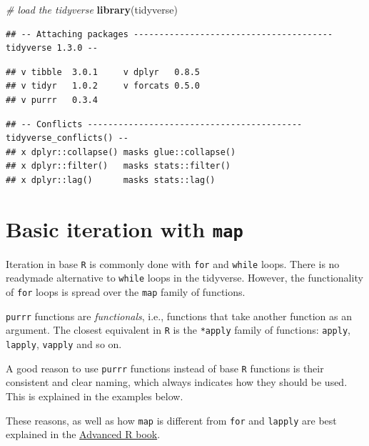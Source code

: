 \documentclass[]{book}
\newenvironment{Shaded}{}{}
\newcommand{\CommentTok}[1]{\textcolor[rgb]{0.38,0.63,0.69}{\textit{#1}}}
\newcommand{\KeywordTok}[1]{\textcolor[rgb]{0.00,0.44,0.13}{\textbf{#1}}}
\newcommand{\NormalTok}[1]{#1}
\begin{document}
\begin{Shaded}
\begin{Highlighting}[]
\CommentTok{# load the tidyverse}
\KeywordTok{library}\NormalTok{(tidyverse)}
\end{Highlighting}
\end{Shaded}

\begin{verbatim}
## -- Attaching packages --------------------------------------- tidyverse 1.3.0 --
\end{verbatim}

\begin{verbatim}
## v tibble  3.0.1     v dplyr   0.8.5
## v tidyr   1.0.2     v forcats 0.5.0
## v purrr   0.3.4
\end{verbatim}

\begin{verbatim}
## -- Conflicts ------------------------------------------ tidyverse_conflicts() --
## x dplyr::collapse() masks glue::collapse()
## x dplyr::filter()   masks stats::filter()
## x dplyr::lag()      masks stats::lag()
\end{verbatim}

\hypertarget{basic-iteration-with-map}{%
\section{\texorpdfstring{Basic iteration with \texttt{map}}{Basic iteration with map}}\label{basic-iteration-with-map}}

Iteration in base \texttt{R} is commonly done with \texttt{for} and \texttt{while} loops.
There is no readymade alternative to \texttt{while} loops in the tidyverse.
However, the functionality of \texttt{for} loops is spread over the \texttt{map} family of functions.

\texttt{purrr} functions are \emph{functionals}, i.e., functions that take another function as an argument.
The closest equivalent in \texttt{R} is the \texttt{*apply} family of functions: \texttt{apply}, \texttt{lapply}, \texttt{vapply} and so on.

A good reason to use \texttt{purrr} functions instead of base \texttt{R} functions is their consistent and clear naming, which always indicates how they should be used.
This is explained in the examples below.

These reasons, as well as how \texttt{map} is different from \texttt{for} and \texttt{lapply} are best explained in the \href{https://adv-r.hadley.nz/functionals.html}{Advanced R book}.
\end{document}
